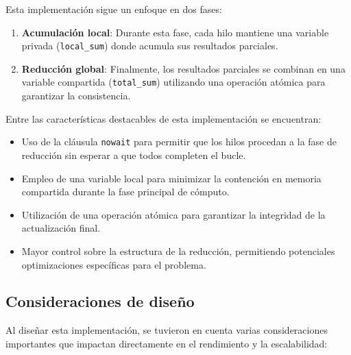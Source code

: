             Esta implementación sigue un enfoque en dos fases:
            
            \begin{enumerate}
            
                \item \textbf{Acumulación local}: Durante esta fase, cada hilo mantiene una variable privada (\texttt{local\_sum}) donde acumula sus resultados parciales.
                
                \item \textbf{Reducción global}: Finalmente, los resultados parciales se combinan en una variable compartida (\texttt{total\_sum}) utilizando una operación atómica para garantizar la consistencia.
                
            \end{enumerate}
            
            Entre las características destacables de esta implementación se encuentran:
            
            \begin{itemize}
            
                \item Uso de la cláusula \texttt{nowait} para permitir que los hilos procedan a la fase de reducción sin esperar a que todos completen el bucle.
                
                \item Empleo de una variable local para minimizar la contención en memoria compartida durante la fase principal de cómputo.
                
                \item Utilización de una operación atómica para garantizar la integridad de la actualización final.
                
                \item Mayor control sobre la estructura de la reducción, permitiendo potenciales optimizaciones específicas para el problema.
                
            \end{itemize}

    \subsection{Consideraciones de diseño}

        Al diseñar esta implementación, se tuvieron en cuenta varias consideraciones importantes que impactan directamente en el rendimiento y la escalabilidad:
        
